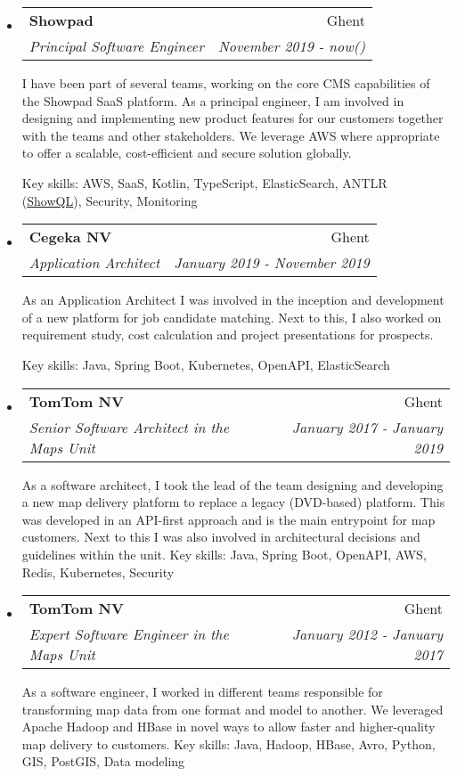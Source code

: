 \documentclass[letterpaper,11pt]{article}
\makeatletter
\newcommand{\ressubheading}[4]{
	\begin{tabular*}{6.5in}{l@{\extracolsep{\fill}}r}
		\textbf{#1} & #2 \\
		\textit{#3} & \textit{#4} \\
	\end{tabular*}\vspace{-6pt}}
\makeatother
\begin{document}
	\begin{itemize}
		
		\item
		\ressubheading{Showpad}{Ghent}{Principal Software Engineer}{November 2019 - now()}
		 \break	 
		\begin{flushleft}
		I have been part of several teams, working on the core CMS capabilities of the Showpad SaaS platform. As a principal engineer, I am involved in designing and implementing new product features for our customers together with the teams and other stakeholders. We leverage AWS where appropriate to offer a scalable, cost-efficient and secure solution globally.
		
		Key skills: AWS, SaaS, Kotlin, TypeScript, ElasticSearch, ANTLR (\href{https://developer.showpad.com/docs/apis/content/showql}{ShowQL}), Security, Monitoring
		\end{flushleft}

		\item
		\ressubheading{Cegeka NV}{Ghent}{Application Architect}{January 2019 - November 2019}
		\break
		\begin{flushleft}
		As an Application Architect I was involved in the inception and development of a new platform for job candidate matching. Next to this, I also worked on requirement study, cost calculation and project presentations for prospects.
		
		Key skills: Java, Spring Boot, Kubernetes, OpenAPI, ElasticSearch
		\end{flushleft}		
		
		\item
		\ressubheading{TomTom NV}{Ghent}{Senior Software Architect in the Maps Unit}{January 2017 - January 2019}
		\begin{flushleft}
			As a software architect, I took the lead of the team designing and developing a new map delivery platform to replace a legacy (DVD-based) platform. This was developed in an API-first approach and is the main entrypoint for map customers. Next to this I was also involved in architectural decisions and guidelines within the unit.
			\break
			Key skills: Java, Spring Boot, OpenAPI, AWS, Redis, Kubernetes, Security
		\end{flushleft}
		
		\item
		\ressubheading{TomTom NV}{Ghent}{Expert Software Engineer in the Maps Unit}{January 2012 - January 2017}
		\begin{flushleft}
			As a software engineer, I worked in different teams responsible for transforming map data from one format and model to another. We leveraged Apache Hadoop and HBase in novel ways to allow faster and higher-quality map delivery to customers.
			\break
			Key skills: Java, Hadoop, HBase, Avro, Python, GIS, PostGIS, Data modeling
		\end{flushleft}
		

\end{itemize}
\end{document}
